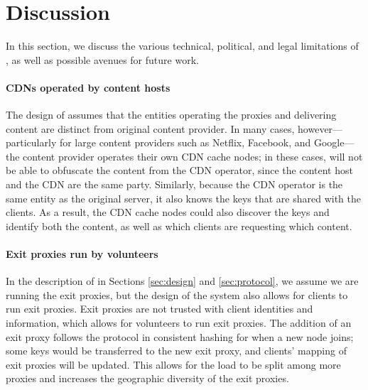 \section{Discussion}
\label{sec:discussion}

In this section, we discuss the various technical, political, and legal limitations
of \system{}, as well as possible avenues for future work. 

\paragraph{CDNs operated by content hosts} The design of \system{}
assumes that the entities operating the proxies and delivering content are
distinct from original content provider. In many cases, however---particularly
for large content providers such as Netflix, Facebook, and Google---the
content provider operates their own CDN cache nodes; in these cases, \system{} will
not be able to obfuscate the content from the CDN operator, since the content host
and the CDN are the same party.  Similarly, because the CDN operator is the same
entity as the original server, it also knows the keys that are shared with the clients.
As a result, the CDN cache nodes could also discover the keys and identify both
the content, as well as which clients are requesting which content.

\paragraph{Exit proxies run by volunteers} In the description of \system{} in Sections 
\ref{sec:design} and \ref{sec:protocol}, we assume we are running the exit proxies, but 
the design of the system also allows for clients to run exit proxies.  Exit proxies are not 
trusted with client identities and information, which allows for volunteers to run exit proxies.  
The addition of an exit proxy follows the protocol in consistent hashing for when a new node 
joins; some keys would be transferred to the new exit proxy, and clients' mapping of 
exit proxies will be updated.  This allows for the load to be split among more proxies and 
increases the geographic diversity of the exit proxies.


